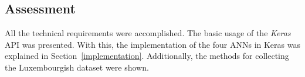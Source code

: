 
\subsection{Assessment}

All the technical requirements were accomplished. The basic usage of the
\textit{Keras} API was presented. With this, the implementation of the four ANNs
in Keras was explained in Section~\ref{implementation}. Additionally, the
methods for collecting the Luxembourgish dataset were shown.
